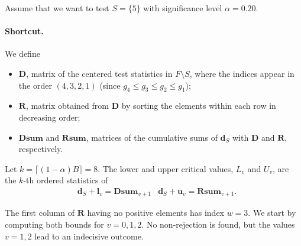 \documentclass[11pt,a4paper,openright,twoside]{article}
\begin{document}
Assume that we want to test $S=\{5\}$ with significance level $\alpha=0.20$.




\paragraph{Shortcut.}
\begin{table}[h!]
\centering
{}
\caption{Supersets of $S=\{5\}$by size. The sets in bold are used to define the lower critical value $L_v$.}
\end{table}

We define
\begin{itemize}
\item $\mathbf{D}$, matrix of the centered test statistics in $F\setminus S$, where the indices appear in the order $(4,3,2,1)$ (since $g_4\leq g_3\leq g_2\leq g_1$);
\item $\mathbf{R}$, matrix obtained from $\mathbf{D}$ by sorting the elements within each row in decreasing order;
\item $\mathbf{Dsum}$ and $\mathbf{Rsum}$, matrices of the cumulative sums of $\mathbf{d}_S$ with $\mathbf{D}$ and $\mathbf{R}$, respectively.
\end{itemize}

Let $k=\lceil (1-\alpha) B\rceil =8$. The lower and upper critical values, $L_v$ and $U_v$, are the $k$-th ordered statistics of
\begin{align*}
& \mathbf{d}_S +\mathbf{l}_{v}=\mathbf{Dsum}_{v+1} & \mathbf{d}_S + \mathbf{u}_v=\mathbf{Rsum}_{v+1}.
\end{align*}

The first column of $\mathbf{R}$ having no positive elements has index $w=3$. We start by computing both bounds for $v=0,1,2$. No non-rejection is found, but the values $v=1,2$ lead to an indecisive outcome.
\end{document}

